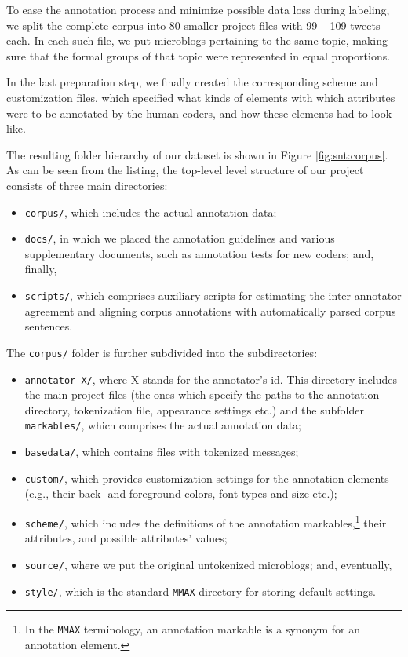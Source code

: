 To ease the annotation process and minimize possible data loss during
labeling, we split the complete corpus into 80 smaller project files
with 99 -- 109 tweets each.  In each such file, we put microblogs
pertaining to the same topic, making sure that the formal groups of
that topic were represented in equal proportions.

In the last preparation step, we finally created the corresponding
scheme and customization files, which specified what kinds of elements
with which attributes were to be annotated by the human coders, and
how these elements had to look like.

The resulting folder hierarchy of our dataset is shown in Figure
\ref{fig:snt:corpus}.  As can be seen from the listing, the top-level
level structure of our project consists of three main directories: {
  \setlength{\linewidth}{\textwidth}
  \begin{itemize}
  \item\texttt{corpus/}, which includes the actual annotation data;

  \item\texttt{docs/}, in which we placed the annotation guidelines and
    various supplementary documents, such as annotation tests for new
    coders; and, finally,

  \item\texttt{scripts/}, which comprises auxiliary scripts for
    estimating the inter-annotator agreement and aligning corpus
    annotations with automatically parsed corpus sentences.
  \end{itemize}
}

The \texttt{corpus/} folder is further subdivided into the
subdirectories:
\begin{itemize}
\item\texttt{annotator-X/}, where X stands for the annotator's id.
  This directory includes the main project files (the ones which
  specify the paths to the annotation directory, tokenization file,
  appearance settings etc.) and the subfolder \texttt{markables/},
  which comprises the actual annotation data;

\item\texttt{basedata/}, which contains files with tokenized messages;

\item\texttt{custom/}, which provides customization settings for the
  annotation elements (e.g., their back- and foreground colors, font
  types and size etc.);

\item\texttt{scheme/}, which includes the definitions of the
  annotation markables,\footnote{In the \texttt{MMAX} terminology, an
    annotation markable is a synonym for an annotation element.}
  their attributes, and possible attributes' values;

\item\texttt{source/}, where we put the original untokenized
  microblogs; and, eventually,

\item\texttt{style/}, which is the standard \texttt{MMAX} directory
  for storing default settings.
\end{itemize}

